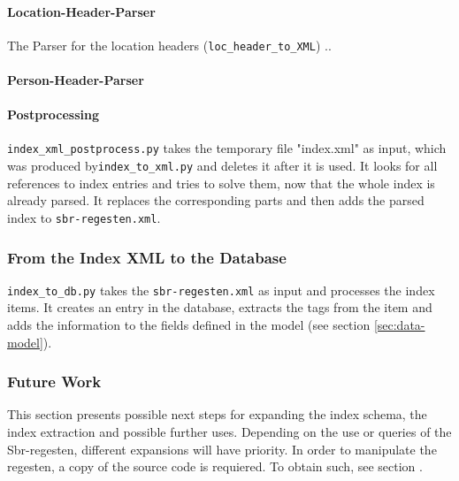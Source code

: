 \paragraph{Location-Header-Parser}
The Parser for the location headers (\texttt{loc\_header\_to\_XML}) ..

\paragraph{Person-Header-Parser}

\paragraph{Postprocessing}
\texttt{index\_xml\_postprocess.py} takes the temporary file "index.xml" as input, which was produced by\texttt{index\_to\_xml.py} and deletes it after it is used. It looks for all references to index entries and tries to solve them, now that the whole index is already parsed. It replaces the corresponding parts and then adds the parsed index to \texttt{sbr-regesten.xml}.

\subsubsection{From the Index XML to the Database}
\texttt{index\_to\_db.py} takes the \texttt{sbr-regesten.xml} as input and processes the index items. It creates an entry in the database, extracts the tags from the item and adds the information to the fields defined in the model (see section \ref{sec:data-model}).





\subsubsection{Future Work}
This section presents possible next steps for expanding the index schema, the index extraction and possible further uses. Depending on the use or queries of the Sbr-regesten, different expansions will have priority. In order to manipulate the regesten, a copy of the source code is requiered. To obtain such, see section \label{sec:git}.
